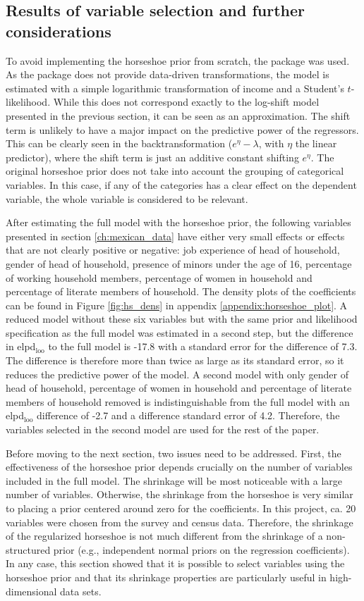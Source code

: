 \subsection{Results of variable selection and further considerations}
To avoid implementing the horseshoe prior from scratch, the package  was used.
As the package does not provide data-driven transformations, the model is estimated with a simple logarithmic transformation of income and a Student's $t$-likelihood.
While this does not correspond exactly to the log-shift model presented in the previous section, it can be seen as an approximation.
The shift term is unlikely to have a major impact on the predictive power of the regressors.
This can be clearly seen in the backtransformation ($e^\eta - \lambda$, with $\eta$ the linear predictor), where the shift term is just an additive constant shifting $e^\eta$.
The original horseshoe prior does not take into account the grouping of categorical variables.
In this case, if any of the categories has a clear effect on the dependent variable, the whole variable is considered to be relevant.

After estimating the full model with the horseshoe prior, the following variables presented in section \ref{ch:mexican_data} have either very small effects or effects that are not clearly positive or negative: job experience of head of household, gender of head of household, presence of minors under the age of 16, percentage of working household members, percentage of women in household and percentage of literate members of household.
The density plots of the coefficients can be found in Figure \ref{fig:hs_dens} in appendix \ref{appendix:horseshoe_plot}.
A reduced model without these six variables but with the same prior and likelihood specification as the full model was estimated in a second step, but the difference in elpd$_{\text{loo}}$ to the full model is -17.8 with a standard error for the difference of 7.3.
The difference is therefore more than twice as large as its standard error, so it reduces the predictive power of the model.
A second model with only gender of head of household, percentage of women in household and percentage of literate members of household removed is indistinguishable from the full model with an elpd$_{\text{loo}}$ difference of -2.7 and a difference standard error of 4.2.
Therefore, the variables selected in the second model are used for the rest of the paper.

Before moving to the next section, two issues need to be addressed.
First, the effectiveness of the horseshoe prior depends crucially on the number of variables included in the full model.
The shrinkage will be most noticeable with a large number of variables.
Otherwise, the shrinkage from the horseshoe is very similar to placing a prior centered around zero for the coefficients.
In this project, ca. 20 variables were chosen from the survey and census data.
Therefore, the shrinkage of the regularized horseshoe is not much different from the shrinkage of a non-structured prior (e.g., independent normal priors on the regression coefficients).
In any case, this section showed that it is possible to select variables using the horseshoe prior and that its shrinkage properties are particularly useful in high-dimensional data sets.

